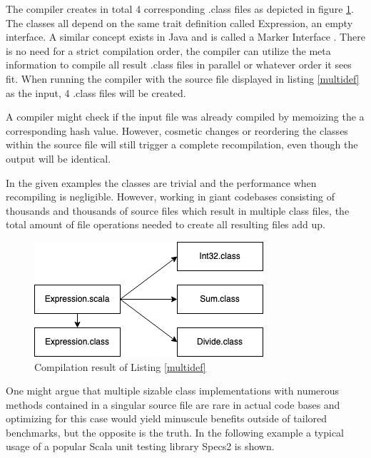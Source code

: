 \documentclass{VUMIFPSbakalaurinis}
\begin{document}


The compiler creates in total 4 corresponding .class files as depicted in figure \ref{img:Expression}.
The classes all depend on the same trait definition called Expression, an empty interface.
A similar concept exists in Java and is called a Marker Interface \cite{10.5555/1407381}.
There is no need for a strict compilation order, the compiler can utilize the meta information to compile all result .class files in parallel or whatever order it sees fit.
When running the compiler with the source file displayed in listing \ref{multidef} as the input, 4 .class files will be created.

A compiler might check if the input file was already compiled by memoizing the a corresponding hash value.
However, cosmetic changes or reordering the classes within the source file will still trigger a complete recompilation, even though the output will be identical.

In the given examples the classes are trivial and the performance when recompiling is negligible.
However, working in giant codebases consisting of thousands and thousands of source files which result in multiple class files, the total amount of file operations needed to create all resulting files add up.

\begin{figure}[H]
    \centering
    \includegraphics[scale=0.6]{img/Expression}
    \caption{Compilation result of Listing \ref{multidef}}
    \label{img:Expression}
\end{figure}

One might argue that multiple sizable class implementations with numerous methods contained in a singular source file are rare in actual code bases and optimizing for this case would yield minuscule benefits outside of tailored benchmarks, but the opposite is the truth. %
In the following example a typical usage of a popular Scala unit testing library Specs2 \cite{Specs2Github} is shown.
\end{document}

